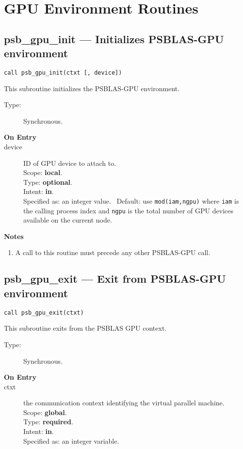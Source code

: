 
\section{GPU Environment Routines}
\label{sec:gpuenv}

\subsection*{psb\_gpu\_init --- Initializes PSBLAS-GPU
  environment}

\begin{verbatim}
call psb_gpu_init(ctxt [, device])
\end{verbatim}

This subroutine initializes the PSBLAS-GPU  environment. 
\begin{description}
\item[Type:] Synchronous.
\item[\bf  On Entry ]
\item[device] ID of GPU device to attach to.\\
Scope: {\bf local}.\\
Type: {\bf optional}.\\
Intent: {\bf in}.\\
Specified as: an integer value. \
Default: use \verb|mod(iam,ngpu)| where \verb|iam| is the calling
process index and \verb|ngpu| is the total number of GPU devices
available on the current node. 
\end{description}


{\par\noindent\large\bfseries Notes}
\begin{enumerate}
\item A call to this routine must precede any other PSBLAS-GPU call. 
\end{enumerate}

\subsection*{psb\_gpu\_exit --- Exit from  PSBLAS-GPU
  environment}

\begin{verbatim}
call psb_gpu_exit(ctxt)
\end{verbatim}

This subroutine exits from the  PSBLAS GPU context.
\begin{description}
\item[Type:] Synchronous.
\item[\bf  On Entry ]
\item[ctxt] the communication context identifying the virtual
  parallel machine.\\
Scope: {\bf global}.\\
Type: {\bf required}.\\
Intent: {\bf in}.\\
Specified as: an integer variable.
\end{description}




